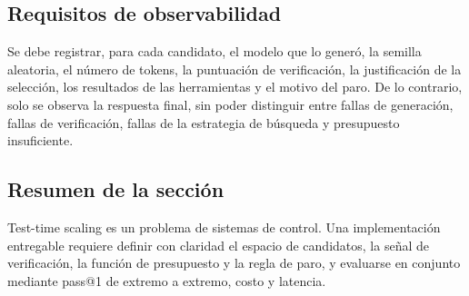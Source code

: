 \subsection{Requisitos de observabilidad}

Se debe registrar, para cada candidato, el modelo que lo generó, la semilla aleatoria, el número de tokens, la puntuación de verificación, la justificación de la selección, los resultados de las herramientas y el motivo del paro. De lo contrario, solo se observa la respuesta final, sin poder distinguir entre fallas de generación, fallas de verificación, fallas de la estrategia de búsqueda y presupuesto insuficiente.

\subsection{Resumen de la sección}

Test-time scaling es un problema de sistemas de control. Una implementación entregable requiere definir con claridad el espacio de candidatos, la señal de verificación, la función de presupuesto y la regla de paro, y evaluarse en conjunto mediante pass@1 de extremo a extremo, costo y latencia.
